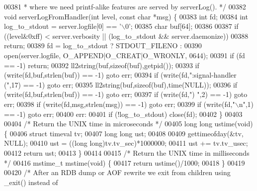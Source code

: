 \begin{DoxyCode}
{{{{{00381 \textcolor{comment}{ * where we need printf-alike features are served by serverLog(). */}
00382 \textcolor{keywordtype}{void} serverLogFromHandler(\textcolor{keywordtype}{int} level, \textcolor{keyword}{const} \textcolor{keywordtype}{char} *msg) \{
00383     \textcolor{keywordtype}{int} fd;
00384     \textcolor{keywordtype}{int} log\_to\_stdout = server.logfile[0] == \textcolor{stringliteral}{'\(\backslash\)0'};
00385     \textcolor{keywordtype}{char} buf[64];
00386 
00387     \textcolor{keywordflow}{if} ((level&0xff) < server.verbosity || (log\_to\_stdout && server.daemonize))
00388         \textcolor{keywordflow}{return};
00389     fd = log\_to\_stdout ? STDOUT\_FILENO :
00390                          open(server.logfile, O\_APPEND|O\_CREAT|O\_WRONLY, 0644);
00391     \textcolor{keywordflow}{if} (fd == -1) \textcolor{keywordflow}{return};
00392     ll2string(buf,\textcolor{keyword}{sizeof}(buf),getpid());
00393     \textcolor{keywordflow}{if} (write(fd,buf,strlen(buf)) == -1) \textcolor{keywordflow}{goto} err;
00394     \textcolor{keywordflow}{if} (write(fd,\textcolor{stringliteral}{":signal-handler ("},17) == -1) \textcolor{keywordflow}{goto} err;
00395     ll2string(buf,\textcolor{keyword}{sizeof}(buf),time(NULL));
00396     \textcolor{keywordflow}{if} (write(fd,buf,strlen(buf)) == -1) \textcolor{keywordflow}{goto} err;
00397     \textcolor{keywordflow}{if} (write(fd,\textcolor{stringliteral}{") "},2) == -1) \textcolor{keywordflow}{goto} err;
00398     \textcolor{keywordflow}{if} (write(fd,msg,strlen(msg)) == -1) \textcolor{keywordflow}{goto} err;
00399     \textcolor{keywordflow}{if} (write(fd,\textcolor{stringliteral}{"\(\backslash\)n"},1) == -1) \textcolor{keywordflow}{goto} err;
00400 err:
00401     \textcolor{keywordflow}{if} (!log\_to\_stdout) close(fd);
00402 \}
00403 
00404 \textcolor{comment}{/* Return the UNIX time in microseconds */}
00405 \textcolor{keywordtype}{long} \textcolor{keywordtype}{long} ustime(\textcolor{keywordtype}{void}) \{
00406     \textcolor{keyword}{struct} timeval tv;
00407     \textcolor{keywordtype}{long} \textcolor{keywordtype}{long} ust;
00408 
00409     gettimeofday(&tv, NULL);
00410     ust = ((\textcolor{keywordtype}{long} \textcolor{keywordtype}{long})tv.tv\_sec)*1000000;
00411     ust += tv.tv\_usec;
00412     \textcolor{keywordflow}{return} ust;
00413 \}
00414 
00415 \textcolor{comment}{/* Return the UNIX time in milliseconds */}
00416 mstime\_t mstime(\textcolor{keywordtype}{void}) \{
00417     \textcolor{keywordflow}{return} ustime()/1000;
00418 \}
00419 
00420 \textcolor{comment}{/* After an RDB dump or AOF rewrite we exit from children using \_exit() instead of}
}}}}}
\end{DoxyCode}
